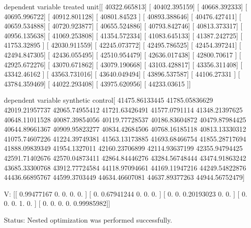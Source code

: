 dependent variable treated unit[[ 40322.665813]
 [ 40402.395159]
 [ 40668.392333]
 [ 40695.996722]
 [ 40912.801128]
 [ 40801.84523 ]
 [ 40893.388646]
 [ 40476.427411]
 [ 40659.534888]
 [ 40720.923877]
 [ 40655.524886]
 [ 40793.842746]
 [ 40813.373317]
 [ 40956.135638]
 [ 41069.253808]
 [ 41354.572334]
 [ 41083.645133]
 [ 41387.242725]
 [ 41753.32895 ]
 [ 42030.911559]
 [ 42245.073772]
 [ 42495.786525]
 [ 42454.397241]
 [ 42494.847305]
 [ 42436.055495]
 [ 42510.954479]
 [ 42636.017438]
 [ 42800.70617 ]
 [ 42925.672276]
 [ 43070.671862]
 [ 43079.190668]
 [ 43103.428817]
 [ 43356.311408]
 [ 43342.46162 ]
 [ 43563.731016]
 [ 43640.049494]
 [ 43896.537587]
 [ 44106.27331 ]
 [ 43784.359469]
 [ 44022.293408]
 [ 43975.620956]
 [ 44233.03615 ]]

dependent variable synthetic control[ 41475.86133445  41785.05836629  42019.21957737  42065.74955412
  41721.63426491  41577.0791114   41348.21397625  40648.11011528
  40087.39854056  40119.77728537  40186.83604872  40479.87984425
  40644.89661367  40909.95823277  40834.42684506  40768.16185118
  40813.13330312  41075.74607226  41224.39749381  41563.13173885
  41693.68466754  41855.28717694  41888.09839349  41954.1327011
  42160.23706899  42114.93637199  42355.94794425  42591.71402676
  42570.04873411  42864.84446276  43284.56748444  43474.91863242
  43685.33300768  43912.77724584  44118.97094661  44169.11947216
  44249.54822876  44436.66895767  44599.3703449   44634.46607081
  44637.89377263  44944.56752479]

 V:
[[ 0.99477167  0.          0.          0.          0.        ]
 [ 0.          0.67941244  0.          0.          0.        ]
 [ 0.          0.          0.20193023  0.          0.        ]
 [ 0.          0.          0.          1.          0.        ]
 [ 0.          0.          0.          0.          0.99985982]]

 Status:
Nested optimization was performed successfully.